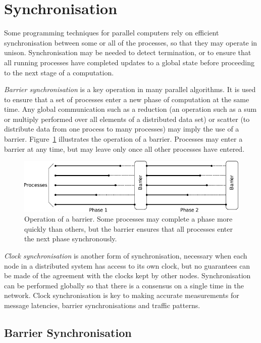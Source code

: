 \section{Synchronisation \label{sec:sync}}

Some programming techniques for parallel computers rely on efficient
synchronisation between some or all of the processes, so that they may operate
in unison. Synchronisation may be needed to detect termination, or to ensure
that all running processes have completed updates to a global state before
proceeding to the next stage of a computation.  

\emph{Barrier synchronisation} is a key operation in many parallel algorithms.
It is used to ensure that a set of processes enter a new phase of computation at
the same time. Any global communication such as a reduction (an operation such
as a sum or multiply performed over all elements of a distributed data set) or
scatter (to distribute data from one process to many processes) may imply the
use of a barrier.  Figure~\ref{fig:barrier} illustrates the operation of a
barrier. Processes may enter a barrier at any time, but may leave only once all
other processes have entered. 

\begin{figure}
\centering
\includegraphics[scale=1]{../images/barrier.pdf}
\caption{Operation of a barrier. Some processes may complete a phase more
quickly than others, but the barrier ensures that all processes enter the next
phase synchronously.}
\label{fig:barrier}
\end{figure}

\emph{Clock synchronisation} is another form of synchronisation, necessary when
each node in a distributed system has access to its own clock, but no guarantees
can be made of the agreement with the clocks kept by other nodes.
Synchronisation can be performed globally so that there is a consensus on a
single time in the network.  Clock synchronisation is key to making accurate
measurements for message latencies, barrier synchronisations and traffic
patterns. 

\subsection{Barrier Synchronisation \label{sec:barrier}}

